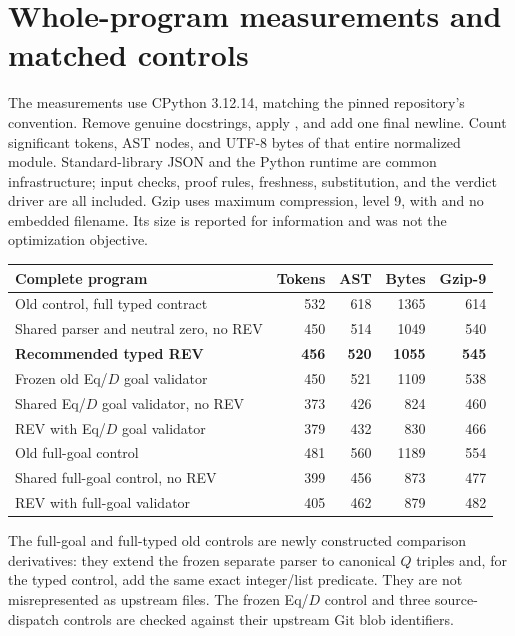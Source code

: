 \section{Whole-program measurements and matched controls}
\label{sec:measurements}

The measurements use CPython 3.12.14, matching the pinned repository's
convention. Remove genuine docstrings, apply , and add
one final newline. Count significant tokens, AST nodes, and UTF-8 bytes
of that entire normalized module. Standard-library JSON and the Python
runtime are common infrastructure; input checks, proof rules, freshness,
substitution, and the verdict driver are all included. Gzip uses maximum
compression, level 9, with  and no embedded filename. Its
size is reported for information and was not the optimization objective.

\begin{center}\small
\begin{tabular}{@{}lrrrr@{}}
\toprule
Complete program & Tokens & AST & Bytes & Gzip-9\\
\midrule
Old control, full typed contract & 532 & 618 & 1365 & 614\\
Shared parser and neutral zero, no REV & 450 & 514 & 1049 & 540\\
\textbf{Recommended typed REV} & \textbf{456} & \textbf{520} & \textbf{1055} & \textbf{545}\\
\midrule
Frozen old Eq/$D$ goal validator & 450 & 521 & 1109 & 538\\
Shared Eq/$D$ goal validator, no REV & 373 & 426 & 824 & 460\\
REV with Eq/$D$ goal validator & 379 & 432 & 830 & 466\\
Old full-goal control & 481 & 560 & 1189 & 554\\
Shared full-goal control, no REV & 399 & 456 & 873 & 477\\
REV with full-goal validator & 405 & 462 & 879 & 482\\
\bottomrule
\end{tabular}
\end{center}

The full-goal and full-typed old controls are newly constructed comparison
derivatives: they extend the frozen separate parser to canonical $Q$
triples and, for the typed control, add the same exact integer/list
predicate. They are not misrepresented as upstream files. The frozen
Eq/$D$ control and three source-dispatch controls are checked against
their upstream Git blob identifiers.

